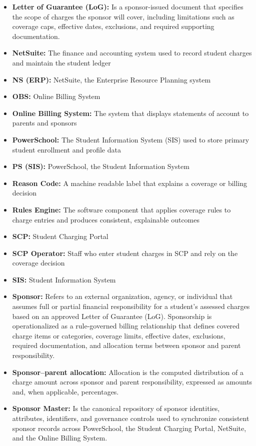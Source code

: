 \begin{itemize}
  \item \textbf{Letter of Guarantee (LoG):} Is a sponsor-issued document that specifies the scope of charges the sponsor will cover, including limitations such as coverage caps, effective dates, exclusions, and required supporting documentation.
  \item \textbf{NetSuite:} The finance and accounting system used to record student charges and maintain the student ledger
  \item \textbf{NS (ERP):} NetSuite, the Enterprise Resource Planning system
  \item \textbf{OBS:} Online Billing System
  \item \textbf{Online Billing System:} The system that displays statements of account to parents and sponsors
  \item \textbf{PowerSchool:} The Student Information System (SIS) used to store primary student enrollment and profile data
  \item \textbf{PS (SIS):} PowerSchool, the Student Information System
  \item \textbf{Reason Code:} A machine readable label that explains a coverage or billing decision
  \item \textbf{Rules Engine:} The software component that applies coverage rules to charge entries and produces consistent, explainable outcomes
  \item \textbf{SCP:} Student Charging Portal
  \item \textbf{SCP Operator:} Staff who enter student charges in SCP and rely on the coverage decision
  \item \textbf{SIS:} Student Information System
  \item \textbf{Sponsor:} Refers to an external organization, agency, or individual that assumes full or partial financial responsibility for a student’s assessed charges based on an approved Letter of Guarantee (LoG). Sponsorship is operationalized as a rule-governed billing relationship that defines covered charge items or categories, coverage limits, effective dates, exclusions, required documentation, and allocation terms between sponsor and parent responsibility.
  \item \textbf{Sponsor–parent allocation:} Allocation is the computed distribution of a charge amount across sponsor and parent responsibility, expressed as amounts and, when applicable, percentages.
  \item \textbf{Sponsor Master:} Is the canonical repository of sponsor identities, attributes, identifiers, and governance controls used to synchronize consistent sponsor records across PowerSchool, the Student Charging Portal, NetSuite, and the Online Billing System.

\end{itemize}
